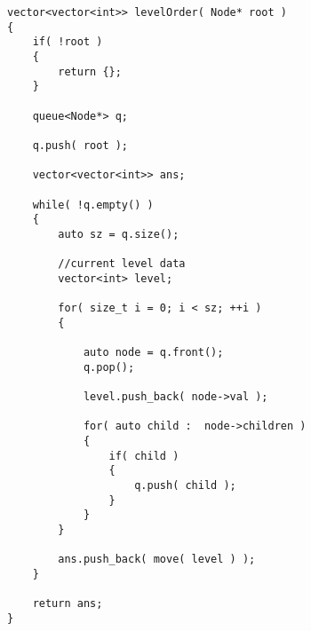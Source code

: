 \setcounter{lstlisting}{0}
\begin{lstlisting}[style=customc, caption={Queue}]
vector<vector<int>> levelOrder( Node* root )
{
    if( !root )
    {
        return {};
    }

    queue<Node*> q;

    q.push( root );

    vector<vector<int>> ans;

    while( !q.empty() )
    {
        auto sz = q.size();

        //current level data
        vector<int> level;

        for( size_t i = 0; i < sz; ++i )
        {

            auto node = q.front();
            q.pop();

            level.push_back( node->val );

            for( auto child :  node->children )
            {
                if( child )
                {
                    q.push( child );
                }
            }
        }

        ans.push_back( move( level ) );
    }

    return ans;
}
\end{lstlisting}
